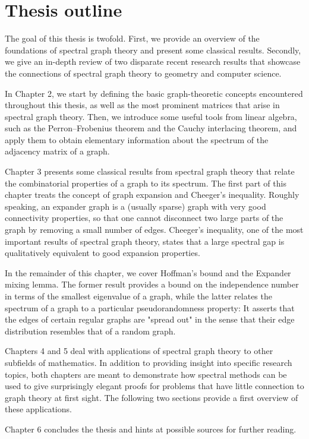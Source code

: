 \section{Thesis outline}
The goal of this thesis is twofold.
First, we provide an overview of the foundations of spectral graph theory and present some classical results.
Secondly, we give an in-depth review of two disparate recent research results that showcase the connections of spectral graph theory to geometry and computer science.

In Chapter 2, we start by defining the basic graph-theoretic concepts encountered throughout this thesis, as well as the most prominent matrices that arise in spectral graph theory.
Then, we introduce some useful tools from linear algebra, such as the Perron--Frobenius theorem and the Cauchy interlacing theorem, and apply them to obtain elementary information about the spectrum of the adjacency matrix of a graph.

Chapter 3 presents some classical results from spectral graph theory that relate the combinatorial properties of a graph to its spectrum. 
The first part of this chapter treats the concept of graph expansion and Cheeger's inequality.
Roughly speaking, an expander graph is a (usually sparse) graph with very good connectivity properties, so that one cannot disconnect two large parts of the graph by removing a small number of edges. 
Cheeger's inequality, one of the most important results of spectral graph theory, states that a large spectral gap is qualitatively equivalent to good expansion properties.

In the remainder of this chapter, we cover Hoffman's bound and the Expander mixing lemma.
The former result provides a bound on the independence number in terms of the smallest eigenvalue of a graph, while the latter relates the spectrum of a graph to a particular pseudorandomness property: 
It asserts that the edges of certain regular graphs are "spread out" in the sense that their edge distribution resembles that of a random graph.

Chapters 4 and 5 deal with applications of spectral graph theory to other subfields of mathematics.
In addition to providing insight into specific research topics, both chapters are meant to demonstrate how spectral methods can be used to give surprisingly elegant proofs for problems that have little connection to graph theory at first sight. 
The following two sections provide a first overview of these applications.

Chapter 6 concludes the thesis and hints at possible sources for further reading.

